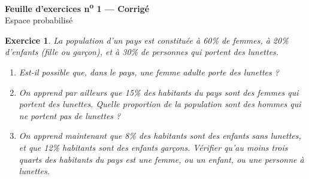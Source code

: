 \documentclass[12pt,a4paper]{article}
\newtheorem{exercice}{Exercice}
\begin{document}
\begin{center}{\Large\bfseries Feuille d'exercices n\textsuperscript{o} 1 --- Corrigé}\\[.2em]{\large Espace probabilisé}\end{center}


\begin{exercice}
    La population d'un pays est constituée à 60\% de femmes, à 20\% d'enfants (fille ou
garçon), et à 30\% de personnes qui portent des lunettes.
\begin{enumerate}
    \item Est-il possible que, dans le pays, une femme adulte porte des lunettes ?
    \item On apprend par ailleurs que 15\% des habitants du pays sont des femmes qui
portent des lunettes. Quelle proportion de la population sont des hommes qui ne portent
pas de lunettes ?
     \item On apprend maintenant que 8\% des habitants sont des enfants sans lunettes,
et que 12\% habitants sont des enfants garçons. Vérifier qu'au moins trois quarts des
habitants du pays est une femme, ou un enfant, ou une personne à lunettes.
\end{enumerate}
\end{exercice}
\end{document}
